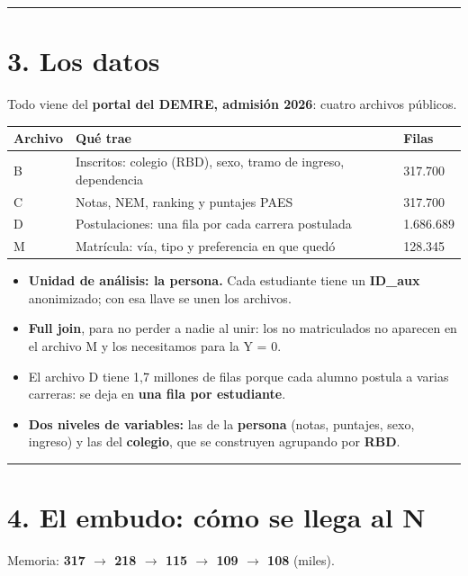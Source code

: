 \documentclass[11pt]{article}
\begin{document}
\medskip\hrule\medskip

\section*{3. Los datos}

Todo viene del \textbf{portal del DEMRE, admisión 2026}: cuatro archivos públicos.\par

\begin{tabularx}{\linewidth}{lXl}\toprule
\textbf{Archivo} & \textbf{Qué trae} & \textbf{Filas}\\ \midrule
B & Inscritos: colegio (RBD), sexo, tramo de ingreso, dependencia & 317.700\\
C & Notas, NEM, ranking y puntajes PAES & 317.700\\
D & Postulaciones: una fila por cada carrera postulada & 1.686.689\\
M & Matrícula: vía, tipo y preferencia en que quedó & 128.345\\
\bottomrule\end{tabularx}\medskip

\begin{itemize}
\item \textbf{Unidad de análisis: la persona.} Cada estudiante tiene un \textbf{ID\_aux} anonimizado; con esa llave se unen los archivos.
\item \textbf{Full join}, para no perder a nadie al unir: los no matriculados no aparecen en el archivo M y los necesitamos para la Y = 0.
\item El archivo D tiene 1,7 millones de filas porque cada alumno postula a varias carreras: se deja en \textbf{una fila por estudiante}.
\item \textbf{Dos niveles de variables:} las de la \textbf{persona} (notas, puntajes, sexo, ingreso) y las del \textbf{colegio}, que se construyen agrupando por \textbf{RBD}.
\end{itemize}

\medskip\hrule\medskip

\section*{4. El embudo: cómo se llega al N}

Memoria: \textbf{317 $\rightarrow$ 218 $\rightarrow$ 115 $\rightarrow$ 109 $\rightarrow$ 108} (miles).\par
\end{document}
